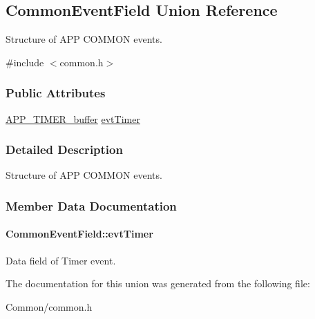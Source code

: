 \hypertarget{union_common_event_field}{}\subsection{Common\+Event\+Field Union Reference}
\label{union_common_event_field}


Structure of A\+PP C\+O\+M\+M\+ON events.  




{\ttfamily \#include $<$common.\+h$>$}

\subsubsection*{Public Attributes}
\begin{DoxyCompactItemize}
\item 
\hyperlink{struct_a_p_p___t_i_m_e_r__buffer}{A\+P\+P\+\_\+\+T\+I\+M\+E\+R\+\_\+buffer} \hyperlink{union_common_event_field_a79797b1aea9f3f7530aa144105f592de}{evt\+Timer}
\end{DoxyCompactItemize}


\subsubsection{Detailed Description}
Structure of A\+PP C\+O\+M\+M\+ON events. 

\subsubsection{Member Data Documentation}
\paragraph[{\texorpdfstring{evt\+Timer}{evtTimer}}]{ Common\+Event\+Field\+::evt\+Timer}\hypertarget{union_common_event_field_a79797b1aea9f3f7530aa144105f592de}{}\label{union_common_event_field_a79797b1aea9f3f7530aa144105f592de}
Data field of Timer event. 

The documentation for this union was generated from the following file\+:\begin{DoxyCompactItemize}
\item 
Common/common.\+h\end{DoxyCompactItemize}
